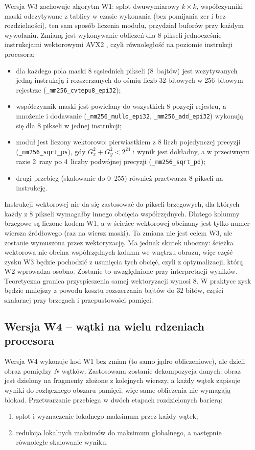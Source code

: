 \documentclass[12pt,a4paper]{article}
\newcommand{\kod}[1]{\texttt{#1}}
\begin{document}
Wersja W3 zachowuje algorytm W1: splot dwuwymiarowy $k \times k$, współczynniki maski odczytywane z tablicy w czasie wykonania (bez pomijania zer i bez rozdzielności), ten sam sposób liczenia modułu, przydział buforów przy każdym wywołaniu. Zmianą jest wykonywanie obliczeń dla 8 pikseli jednocześnie instrukcjami wektorowymi AVX2 \cite{intel}, czyli równoległość na poziomie instrukcji procesora:
\begin{itemize}
	\item dla każdego pola maski 8 sąsiednich pikseli (8~bajtów) jest wczytywanych jedną instrukcją i rozszerzanych do ośmiu liczb 32-bitowych w 256-bitowym rejestrze (\kod{\_mm256\_\allowbreak{}cvtepu8\_epi32});
	\item współczynnik maski jest powielany do wszystkich 8 pozycji rejestru, a mnożenie i dodawanie (\kod{\_mm256\_\allowbreak{}mullo\_epi32}, \kod{\_mm256\_\allowbreak{}add\_epi32}) wykonują się dla 8 pikseli w jednej instrukcji;
	\item moduł jest liczony wektorowo: pierwiastkiem z 8 liczb pojedynczej precyzji (\kod{\_mm256\_\allowbreak{}sqrt\_ps}), gdy $G_x^2 + G_y^2 < 2^{24}$ i wynik jest dokładny, a w przeciwnym razie 2~razy po 4~liczby podwójnej precyzji (\kod{\_mm256\_\allowbreak{}sqrt\_pd});
	\item drugi przebieg (skalowanie do 0--255) również przetwarza 8 pikseli na instrukcję.
\end{itemize}
Instrukcji wektorowej nie da się zastosować do pikseli brzegowych, dla których każdy z 8 pikseli wymagałby innego obcięcia współrzędnych. Dlatego kolumny brzegowe są liczone kodem W1, a w ścieżce wektorowej obcinany jest tylko numer wiersza źródłowego (raz na wiersz maski). Ta zmiana nie jest celem W3, ale zostanie wymuszona przez wektoryzację. Ma jednak skutek uboczny: ścieżka wektorowa nie obcina współrzędnych kolumn we wnętrzu obrazu, więc część zysku W3 będzie pochodzić z usunięcia tych obcięć, czyli z optymalizacji, którą W2 wprowadza osobno. Zostanie to uwzględnione przy interpretacji wyników. Teoretyczna granica przyspieszenia samej wektoryzacji wynosi 8. W praktyce zysk będzie mniejszy z powodu kosztu rozszerzania bajtów do 32 bitów, części skalarnej przy brzegach i przepustowości pamięci.

\subsection{Wersja W4 -- wątki na wielu rdzeniach procesora}

Wersja W4 wykonuje kod W1 bez zmian (to samo jądro obliczeniowe), ale dzieli obraz pomiędzy $N$ wątków. Zastosowana zostanie dekompozycja danych: obraz jest dzielony na fragmenty złożone z kolejnych wierszy, a każdy wątek zapisuje wyniki do rozłącznego obszaru pamięci, więc same obliczenia nie wymagają blokad. Przetwarzanie przebiega w dwóch etapach rozdzielonych barierą:
\begin{enumerate}
	\item splot i wyznaczenie lokalnego maksimum przez każdy wątek;
	\item redukcja lokalnych maksimów do maksimum globalnego, a następnie równoległe skalowanie wyniku.
\end{enumerate}
\end{document}
